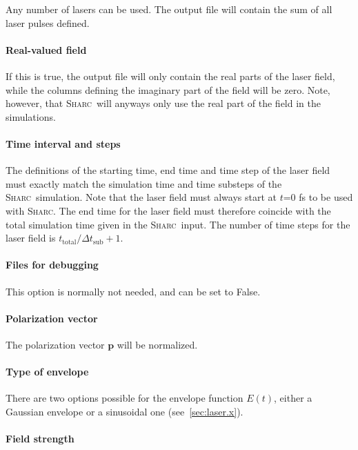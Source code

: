 \documentclass[a4paper,11pt,DIV=15,openany,twoside=false]{scrbook}
\newcommand{\sharc}{\textsc{Sharc}}
\renewcommand{\vec}[1]{\ensuremath{\mathbf{#1}}}
\begin{document}
Any number of lasers can be used. The output file will contain the sum of all laser pulses defined.

\paragraph{Real-valued field}

If this is true, the output file will only contain the real parts of the laser field, while the columns defining the imaginary part of the field will be zero. Note, however, that \sharc\ will anyways only use the real part of the field in the simulations.

\paragraph{Time interval and steps}

The definitions of the starting time, end time and time step of the laser field must exactly match the simulation time and time substeps of the \sharc\ simulation. Note that the laser field must always start at $t$=0 fs to be used with \sharc. The end time for the laser field must therefore coincide with the total simulation time given in the \sharc\ input. The number of time steps for the laser field is $t_\text{total}/\Delta t_\text{sub} +1$.

\paragraph{Files for debugging}

This option is normally not needed, and can be set to False.

\paragraph{Polarization vector}

The polarization vector $\vec{p}$ will be normalized.

\paragraph{Type of envelope}

There are two options possible for the envelope function $E(t)$, either a Gaussian envelope or a sinusoidal one (see~\ref{sec:laser.x}).

\paragraph{Field strength}
\end{document}
